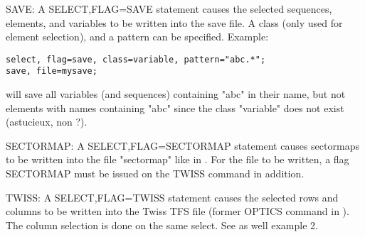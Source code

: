 \label{save_select}
SAVE: A SELECT,FLAG=SAVE statement causes the
selected sequences, elements, and variables to be written into the save
file. A class (only used for element selection), and a pattern can be
specified. Example:  
\begin{verbatim}
select, flag=save, class=variable, pattern="abc.*";
save, file=mysave;
\end{verbatim} 
will save all variables (and sequences) containing "abc" in their name,
but not elements with names containing "abc" since the class "variable"
does not exist (astucieux, non ?).  

SECTORMAP: A SELECT,FLAG=SECTORMAP statement causes sectormaps to be
written into the file "sectormap" like in \madeight. For the file to be
written, a flag SECTORMAP must be issued on the TWISS command in
addition.  

TWISS: A SELECT,FLAG=TWISS statement causes the selected rows and
columns to be written into the Twiss TFS file (former OPTICS command in
\madeight). The column selection is done on the same select. See as well
example 2.  



